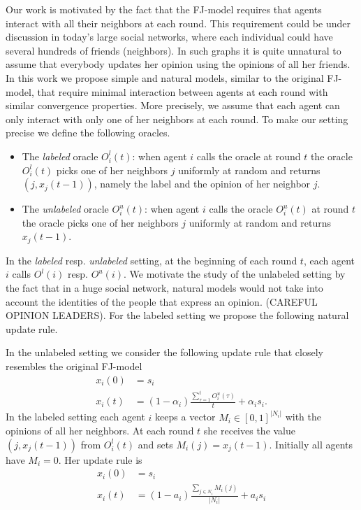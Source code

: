 Our work is motivated by the fact that the FJ-model requires that
agents interact with all their neighbors at each round. This requirement
could be under discussion in today's large social networks, where each individual
could have several hundreds of friends (neighbors). In such graphs it is quite
unnatural to assume that everybody updates her opinion using the opinions of all
her friends. In this work we propose simple and natural models, similar to
the original FJ-model, that require minimal interaction between agents at each
round with similar convergence properties. More precisely, we assume that
each agent can only interact with only one of her neighbors at each round.
To make our setting precise we define the following oracles.
\begin{itemize}
  \item The \emph{labeled} oracle $O^l_i(t)$: when
    agent $i$ calls the oracle at round $t$ the oracle $O^l_i(t)$ picks one
    of her neighbors $j$ uniformly at random and returns $(j, x_j(t-1))$,
    namely the label and the opinion of her neighbor $j$.

  \item The \emph{unlabeled} oracle $O^u_i(t)$: when
    agent $i$ calls the oracle $O^u_i(t)$ at round $t$ the oracle picks one
    of her neighbors $j$ uniformly at random and returns $x_j(t-1)$.
\end{itemize}
In the \emph{labeled} resp. \emph{unlabeled} setting, at the beginning of each
round $t$, each agent $i$ calls $O^l(i)$ resp. $O^u(i)$.
We motivate the study of the unlabeled setting by the fact that
in a huge social network, natural models would not take into account
the identities of the people that express an opinion. (CAREFUL OPINION LEADERS).
For the labeled setting we propose the following natural update rule.

In the unlabeled setting we consider the following update rule that closely
resembles the original FJ-model
\begin{align}
  x_i(0) &= s_i \nonumber \\
  x_i(t) &=
  (1-\alpha_i)\frac{\sum_{\tau=1}^{t} O^u_i(\tau)}{t} + \alpha_i s_i.
\label{eq:unlabeled_update_rule}
\end{align}
In the labeled setting each agent $i$ keeps a vector $M_i \in [0,1]^{|N_i|}$
with the opinions of all her neighbors. At each round $t$ she receives the
value $(j, x_j(t-1))$ from $O_i^l(t)$ and sets $M_i(j) = x_j(t-1)$. Initially
all agents have $M_i = 0$. Her update rule is
\begin{align}
  x_i(0) &= s_i \nonumber \\
  x_i(t) &=  (1-a_i) \frac{\sum_{j\in N_i} M_i(j)}{|N_i|} + a_i s_i
  \label{eq:labeled_update_rule}
\end{align}

